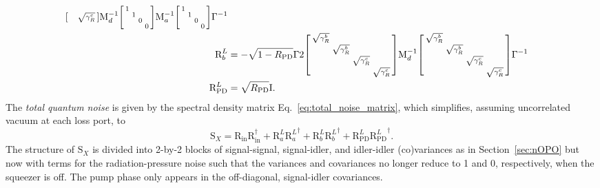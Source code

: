 \begin{align}
\begin{bsmallmatrix}
 &  &  & \sqrt{\gamma^c_R}
\end{bsmallmatrix}\text{M}_d^{-1}\begin{bsmallmatrix}
1 &  &  &  \\
 & 1 &  &  \\
 &  & 0 &  \\
 &  &  & 0
\end{bsmallmatrix}\text{M}_a^{-1}\begin{bsmallmatrix}
1 &  &  &  \\
 & 1 &  &  \\
 &  & 0 &  \\
 &  &  & 0
\end{bsmallmatrix}\Gamma^{-1}\\
\text{R}^L_b&=-\sqrt{1-R_\text{PD}}\Gamma 2\begin{bsmallmatrix}
\sqrt{\gamma^b_R} &  &  &  \\
 & \sqrt{\gamma^b_R} &  &  \\
 &  & \sqrt{\gamma^c_R} &  \\
 &  &  & \sqrt{\gamma^c_R}
\end{bsmallmatrix}\text{M}_d^{-1}\begin{bsmallmatrix}
\sqrt{\gamma^b_R} &  &  &  \\
 & \sqrt{\gamma^b_R} &  &  \\
 &  & \sqrt{\gamma^c_R} &  \\
 &  &  & \sqrt{\gamma^c_R}
\end{bsmallmatrix}\Gamma^{-1}\\
\text{R}^L_\text{PD}&=\sqrt{R_\text{PD}} \text{I}.
\end{align}
\endgroup
The \emph{total quantum noise} is given by the spectral density matrix Eq.~\ref{eq:total_noise_matrix}, which simplifies, assuming uncorrelated vacuum at each loss port, to
\begin{equation}\label{eq:nIS_Sx}
\text{S}_X=\text{R}_\text{in}\text{R}_\text{in}^\dag+\text{R}^L_a{\text{R}^L_a}^\dag+\text{R}^L_b{\text{R}^L_b}^\dag+\text{R}^L_\text{PD}{\text{R}^L_\text{PD}}^\dag.
\end{equation} %
The structure of $\text{S}_X$ is divided into 2-by-2 blocks of signal-signal, signal-idler, and idler-idler (co)variances as in Section~\ref{sec:nOPO} but now with terms for the radiation-pressure noise such that the variances and covariances no longer reduce to 1 and 0, respectively, when the squeezer is off. The pump phase only appears in the off-diagonal, signal-idler covariances.

